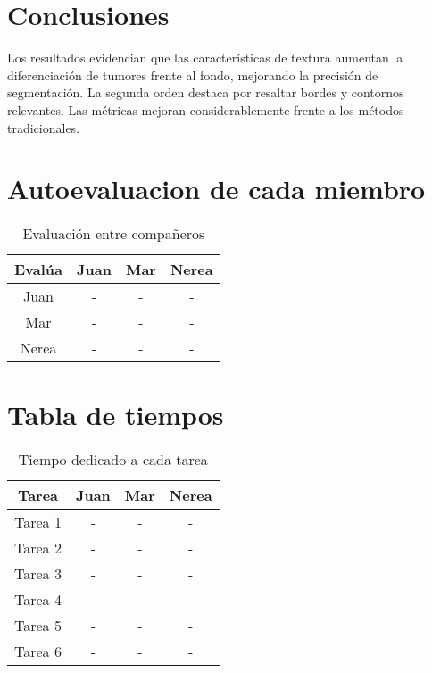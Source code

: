 \documentclass[12pt]{article}
\begin{document}
\section{Conclusiones}
Los resultados evidencian que las características de textura aumentan la diferenciación de tumores frente al fondo, mejorando la precisión de segmentación. La segunda orden destaca por resaltar bordes y contornos relevantes. Las métricas mejoran considerablemente frente a los métodos tradicionales.

\section{Autoevaluacion de cada miembro}

\begin{table}[H]
\centering
\begin{tabular}{|c|c|c|c|}
\hline
\textbf{Evalúa} & \textbf{Juan} & \textbf{Mar} & \textbf{Nerea} \\
\hline
Juan & - & - & - \\
Mar & - & - & - \\
Nerea & - & - & - \\
\hline
\end{tabular}
\caption{Evaluación entre compañeros}
\end{table}

\section{Tabla de tiempos}

\begin{table}[H]
\centering
\begin{tabular}{|c|c|c|c|}
\hline
\textbf{Tarea} & \textbf{Juan} & \textbf{Mar} & \textbf{Nerea} \\
\hline
Tarea 1 & - & - & - \\
Tarea 2 & - & - & - \\
Tarea 3 & - & - & - \\
Tarea 4 & - & - & - \\
Tarea 5 & - & - & - \\
Tarea 6 & - & - & - \\
\hline
\end{tabular}
\caption{Tiempo dedicado a cada tarea}
\end{table}
\end{document}
